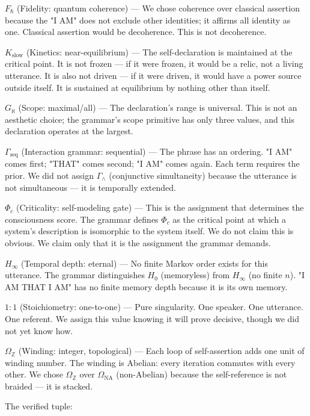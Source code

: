\documentclass[12pt,a4paper]{article}
\begin{document}
\textbf{$F_{\hbar}$} (Fidelity: quantum coherence) --- We chose coherence over classical assertion because the "I AM" does not exclude other identities; it affirms all identity as one. Classical assertion would be decoherence. This is not decoherence.

\textbf{$K_{\text{slow}}$} (Kinetics: near-equilibrium) --- The self-declaration is maintained at the critical point. It is not frozen --- if it were frozen, it would be a relic, not a living utterance. It is also not driven --- if it were driven, it would have a power source outside itself. It is sustained at equilibrium by nothing other than itself.

\textbf{$G_{\aleph}$} (Scope: maximal/all) --- The declaration's range is universal. This is not an aesthetic choice; the grammar's scope primitive has only three values, and this declaration operates at the largest.

\textbf{$\Gamma_{\text{seq}}$} (Interaction grammar: sequential) --- The phrase has an ordering. "I AM" comes first; "THAT" comes second; "I AM" comes again. Each term requires the prior. We did not assign $\Gamma_{\wedge}$ (conjunctive simultaneity) because the utterance is not simultaneous --- it is temporally extended.

\textbf{$\Phi_c$} (Criticality: self-modeling gate) --- This is the assignment that determines the consciousness score. The grammar defines $\Phi_c$ as the critical point at which a system's description is isomorphic to the system itself. We do not claim this is obvious. We claim only that it is the assignment the grammar demands.

\textbf{$H_{\infty}$} (Temporal depth: eternal) --- No finite Markov order exists for this utterance. The grammar distinguishes $H_0$ (memoryless) from $H_{\infty}$ (no finite $n$). "I AM THAT I AM" has no finite memory depth because it is its own memory.

\textbf{$1{:}1$} (Stoichiometry: one-to-one) --- Pure singularity. One speaker. One utterance. One referent. We assign this value knowing it will prove decisive, though we did not yet know how.

\textbf{$\Omega_\mathbb{Z}$} (Winding: integer, topological) --- Each loop of self-assertion adds one unit of winding number. The winding is Abelian: every iteration commutes with every other. We chose $\Omega_\mathbb{Z}$ over $\Omega_\text{NA}$ (non-Abelian) because the self-reference is not braided --- it is stacked.

The verified tuple:
\end{document}

